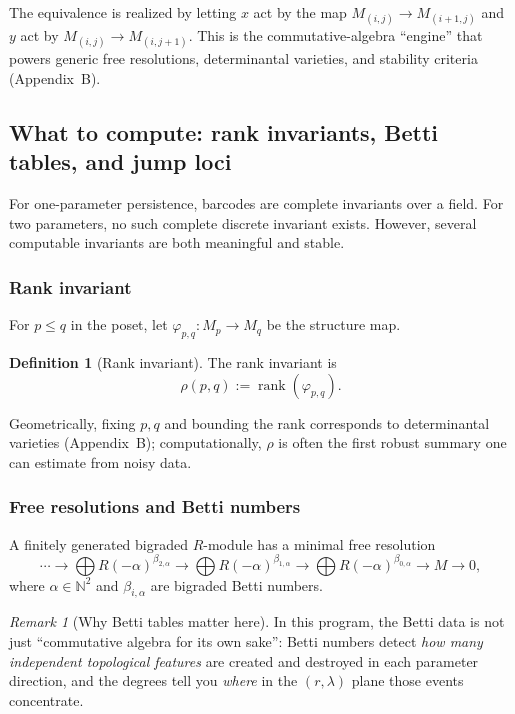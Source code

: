 \documentclass[11pt,oneside]{amsbook}
\numberwithin{equation}{section}
\theoremstyle{plain}
\theoremstyle{definition}
\newtheorem{definition}[theorem]{Definition}
\theoremstyle{remark}
\newtheorem{remark}[theorem]{Remark}
\newcommand{\N}{\mathbb{N}}
\DeclareMathOperator{\rank}{\mathrm{rank}}
\begin{document}
The equivalence is realized by letting $x$ act by the map $M_{(i,j)}\to M_{(i+1,j)}$ and $y$ act by $M_{(i,j)}\to M_{(i,j+1)}$.
This is the commutative-algebra ``engine'' that powers generic free resolutions, determinantal varieties, and stability criteria (Appendix~B).

\subsection{What to compute: rank invariants, Betti tables, and jump loci}
\label{sec:invariants}

For one-parameter persistence, barcodes are complete invariants over a field.
For two parameters, no such complete discrete invariant exists.
However, several computable invariants are both meaningful and stable.

\subsubsection{Rank invariant}
For $p\le q$ in the poset, let $\varphi_{p,q}:M_p\to M_q$ be the structure map.

\begin{definition}[Rank invariant]
The rank invariant is
\[
\rho(p,q) := \rank(\varphi_{p,q}).
\]
\end{definition}

Geometrically, fixing $p,q$ and bounding the rank corresponds to determinantal varieties (Appendix~B); computationally, $\rho$ is often the first robust summary one can estimate from noisy data.

\subsubsection{Free resolutions and Betti numbers}
A finitely generated bigraded $R$-module has a minimal free resolution
\[
\cdots \to \bigoplus R(-\alpha)^{\beta_{2,\alpha}}
\to \bigoplus R(-\alpha)^{\beta_{1,\alpha}}
\to \bigoplus R(-\alpha)^{\beta_{0,\alpha}}
\to M\to 0,
\]
where $\alpha\in\N^2$ and $\beta_{i,\alpha}$ are bigraded Betti numbers.

\begin{remark}[Why Betti tables matter here]
In this program, the Betti data is not just ``commutative algebra for its own sake'':
Betti numbers detect \emph{how many independent topological features} are created and destroyed in each parameter direction, and the degrees tell you \emph{where} in the $(r,\lambda)$ plane those events concentrate.
\end{remark}
\end{document}
